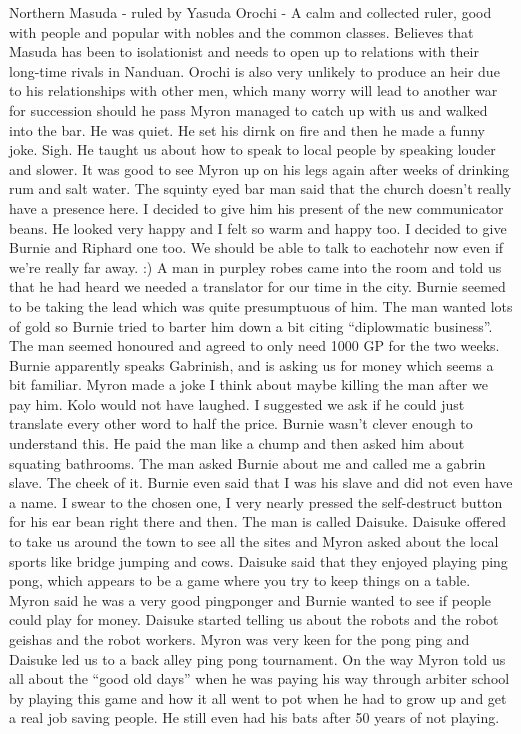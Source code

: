 Northern Masuda - ruled by Yasuda Orochi - A calm and collected ruler, good with people and popular with nobles and the common classes. Believes that Masuda has been to isolationist and needs to open up to relations with their long-time rivals in Nanduan. Orochi is also very unlikely to produce an heir due to his relationships with other men, which many worry will lead to another war for succession should he pass\medskip
Myron managed to catch up with us and walked into the bar. He was quiet. He set his dirnk on fire and then he made a funny joke. Sigh. He taught us about how to speak to local people by speaking louder and slower. It was good to see Myron up on his legs again after weeks of drinking rum and salt water. The squinty eyed bar man said that the church doesn’t really have a presence here. I decided to give him his present of the new communicator beans. He looked very happy and I felt so warm and happy too. I decided to give Burnie and Riphard one too. We should be able to talk to eachotehr now even if we’re really far away. :)\medskip
A man in purpley robes came into the room and told us that he had heard we needed a translator for our time in the city. Burnie seemed to be taking the lead which was quite presumptuous of him. The man wanted lots of gold so Burnie tried to barter him down a bit citing “diplowmatic business”. The man seemed honoured and agreed to only need 1000 GP for the two weeks. Burnie apparently speaks Gabrinish, and is asking us for money which seems a bit familiar. Myron made a joke I think about maybe killing the man after we pay him. Kolo would not have laughed. I suggested we ask if he could just translate every other word to half the price. Burnie wasn’t clever enough to understand this. He paid the man like a chump and then asked him about squating bathrooms. The man asked Burnie about me and called me a gabrin slave. The cheek of it. Burnie even said that I was his slave and did not even have a name. I swear to the chosen one, I very nearly pressed the self-destruct button for his ear bean right there and then. The man is called Daisuke. Daisuke offered to take us around the town to see all the sites and Myron asked about the local sports like bridge jumping and cows. Daisuke said that they enjoyed playing ping pong, which appears to be a game where you try to keep things on a table. Myron said he was a very good pingponger and Burnie wanted to see if people could play for money. Daisuke started telling us about the robots and the robot geishas and the robot workers. Myron was very keen for the pong ping and Daisuke led us to a back alley ping pong tournament. On the way Myron told us all about the “good old days” when he was paying his way through arbiter school by playing this game and how it all went to pot when he had to grow up and get a real job saving people. He still even had his bats after 50 years of not playing.\medskip
